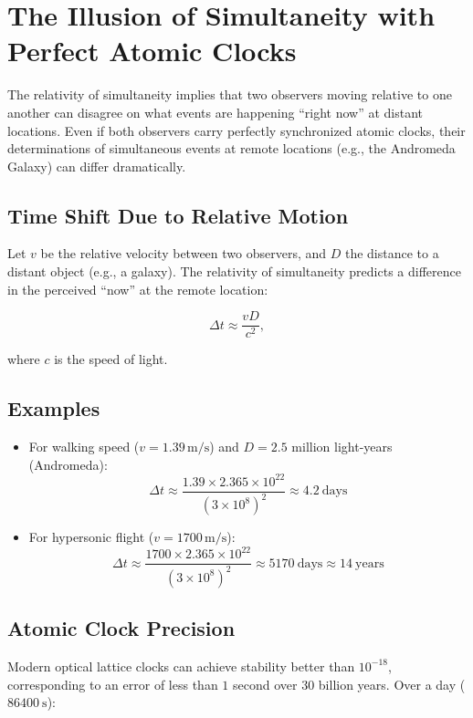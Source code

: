 \section{The Illusion of Simultaneity with Perfect Atomic Clocks}

The relativity of simultaneity implies that two observers moving relative to one another can disagree on what events are happening ``right now'' at distant locations. Even if both observers carry perfectly synchronized atomic clocks, their determinations of simultaneous events at remote locations (e.g., the Andromeda Galaxy) can differ dramatically.

\subsection{Time Shift Due to Relative Motion}

Let $v$ be the relative velocity between two observers, and $D$ the distance to a distant object (e.g., a galaxy). The relativity of simultaneity predicts a difference in the perceived ``now'' at the remote location:

\begin{equation}
\Delta t \approx \frac{v D}{c^2},
\end{equation}

where $c$ is the speed of light.

\subsection*{Examples}
\begin{itemize}
  \item For walking speed ($v = 1.39\,\mathrm{m/s}$) and $D = 2.5$ million light-years (Andromeda):
  \[ \Delta t \approx \frac{1.39 \times 2.365\times10^{22}}{(3\times10^8)^2} \approx 4.2\ \text{days} \]

  \item For hypersonic flight ($v = 1700\,\mathrm{m/s}$):
  \[ \Delta t \approx \frac{1700 \times 2.365\times10^{22}}{(3\times10^8)^2} \approx 5170\ \text{days} \approx 14\ \text{years} \]
\end{itemize}

\subsection{Atomic Clock Precision}

Modern optical lattice clocks can achieve stability better than $10^{-18}$, corresponding to an error of less than $1$ second over $30$ billion years. Over a day ($86400\ \text{s}$):

